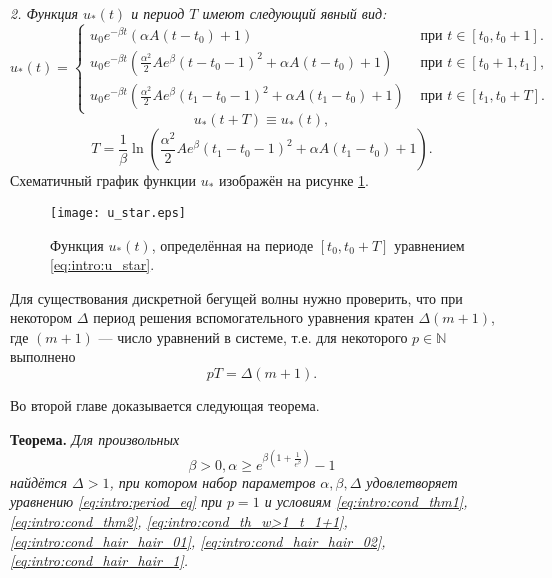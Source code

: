 \textit{2. Функция $u_*(t)$ и период $T$ имеют следующий явный вид:}
%
\small
\begin{equation}
	\label{eq:intro:u_star}
	u_*(t)=
	\begin{cases}
		u_0 e^{-\beta t}(\alpha A(t-t_0)+1) & \text{ при } t\in[t_0,t_0+1].
		\\
		u_0 e^{-\beta t}\left(\frac{\alpha^2}{2}Ae^{\beta}(t-t_0-1)^2+\alpha A(t-t_0)+1\right) & \text{ при } t\in[t_0+1,t_1],
		\\
		u_0 e^{-\beta t}\left(\frac{\alpha^2}{2}Ae^{\beta}(t_1-t_0-1)^2+\alpha A(t_1-t_0)+1\right) & \text{ при } t\in[t_1,t_0+T].
	\end{cases}
\end{equation}
\normalsize
%
\[
u_*(t + T) \equiv u_*(t),
\]
%
\begin{equation}
	\label{eq:intro:mg_period_T}
	T = \dfrac{1}{\beta}\ln\left( \frac{\alpha^2}{2}Ae^{\beta}(t_1-t_0-1)^2+\alpha A(t_1-t_0)+1\right). 
\end{equation}
%
Схематичный график функции $u_*$ изображён на рисунке \ref{fig:intro:u_star}.
%
\begin{figure}[h]
	\centering
	\texttt{[image: u\_star.eps]}
	\caption{Функция $u_*(t)$, определённая на периоде $[t_0, t_0 + T]$ уравнением \eqref{eq:intro:u_star}.}
	\label{fig:intro:u_star}
\end{figure}

Для существования дискретной бегущей волны нужно проверить, что при некотором $\Delta$ период решения вспомогательного уравнения кратен $\Delta (m + 1)$, где $(m + 1)$ --- число уравнений в системе, т.е. для некоторого $p \in \mathbb{N}$ выполнено
\begin{equation}
	\label{eq:intro:period_eq}
	pT = \Delta (m + 1).
\end{equation}

Во второй главе доказывается следующая теорема.

\textbf{Теорема.} \textit{Для произвольных 
%
\begin{equation}
	\label{eq:intro:constraints_parameters_final}
	\beta > 0, \alpha \geq e^{\beta\left(1 + \frac{1}{e^{\beta}}\right)} - 1
\end{equation}
%
найдётся $\Delta > 1$, при котором набор параметров $\alpha, \beta, \Delta$ удовлетворяет уравнению \eqref{eq:intro:period_eq} при $p = 1$ и условиям \eqref{eq:intro:cond_thm1}, \eqref{eq:intro:cond_thm2}, \eqref{eq:intro:cond_th_w>1_t_1+1}, \eqref{eq:intro:cond_hair_hair_01}, \eqref{eq:intro:cond_hair_hair_02}, \eqref{eq:intro:cond_hair_hair_1}.}

